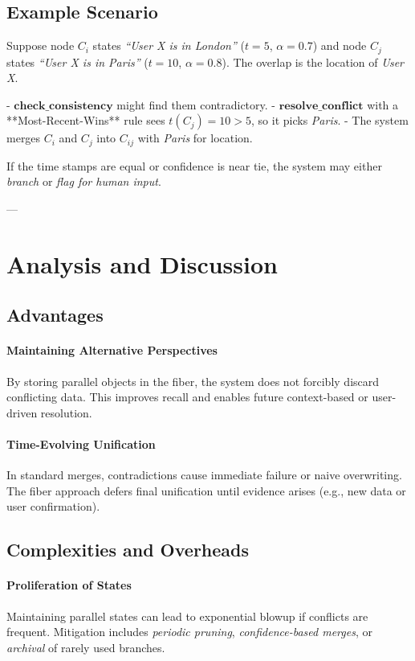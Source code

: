 \documentclass{article}
\begin{document}
\subsection{Example Scenario}

Suppose node $C_i$ states \emph{``User X is in London''} ($t=5$, $\alpha=0.7$) and node $C_j$ states \emph{``User X is in Paris''} ($t=10$, $\alpha=0.8$). The overlap is the location of \emph{User X}.

- \(\textbf{check\_consistency}\) might find them contradictory.  
- \(\textbf{resolve\_conflict}\) with a **Most-Recent-Wins** rule sees $t(C_j)=10 > 5$, so it picks \emph{Paris}.  
- The system merges $C_i$ and $C_j$ into $C_{ij}$ with \emph{Paris} for location.  

If the time stamps are equal or confidence is near tie, the system may either \emph{branch} or \emph{flag for human input}.

---

\section{Analysis and Discussion}
\label{sec:analysis}

\subsection{Advantages}
\paragraph{Maintaining Alternative Perspectives}  
By storing parallel objects in the fiber, the system does not forcibly discard conflicting data. This improves recall and enables future context-based or user-driven resolution.

\paragraph{Time-Evolving Unification}  
In standard merges, contradictions cause immediate failure or naive overwriting. The fiber approach defers final unification until evidence arises (e.g., new data or user confirmation).

\subsection{Complexities and Overheads}
\paragraph{Proliferation of States}  
Maintaining parallel states can lead to exponential blowup if conflicts are frequent. Mitigation includes \emph{periodic pruning}, \emph{confidence-based merges}, or \emph{archival} of rarely used branches.
\end{document}
